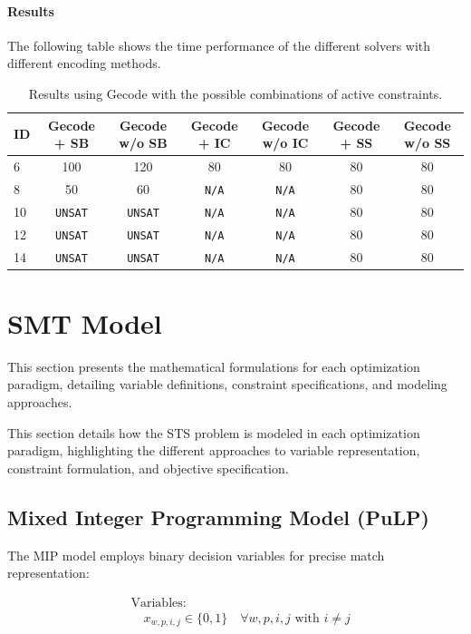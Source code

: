 \documentclass[11pt]{article}
\begin{document}
\paragraph{Results} The following table shows the time performance of the different solvers with different encoding methods.
\begin{table}[H]
\centering
\small
\label{tab:sat}
\begin{tabular}{@{}lcccccc@{}}
\toprule
ID & Gecode + SB & Gecode w/o SB & Gecode + IC & Gecode w/o IC & Gecode + SS & Gecode w/o SS \\
\midrule
6 & 100 & 120 & 80 & 80 & 80 & 80\\
8 & 50 & 60 & \texttt{N/A} & \texttt{N/A} & 80 & 80 \\
10 & \texttt{UNSAT} & \texttt{UNSAT} & \texttt{N/A} & \texttt{N/A} & 80 & 80\\
12 & \texttt{UNSAT} & \texttt{UNSAT} & \texttt{N/A} & \texttt{N/A} & 80 & 80\\
14 & \texttt{UNSAT} & \texttt{UNSAT} & \texttt{N/A} & \texttt{N/A} & 80 & 80\\
\bottomrule
\end{tabular}
\caption{Results using Gecode with the possible combinations of active constraints.}
\end{table}

\section{SMT Model}

This section presents the mathematical formulations for each optimization paradigm, detailing variable definitions, constraint specifications, and modeling approaches.

This section details how the STS problem is modeled in each optimization paradigm, highlighting the different approaches to variable representation, constraint formulation, and objective specification.

\subsection{Mixed Integer Programming Model (PuLP)}

The MIP model employs binary decision variables for precise match representation:

\begin{align}
&\text{Variables:} \\
&\quad x_{w,p,i,j} \in \{0,1\} \quad \forall w,p,i,j \text{ with } i \neq j
\end{align}
\end{document}
